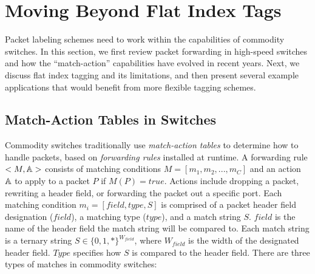 \section{Moving Beyond Flat Index Tags}
\label{sec:background}


Packet labeling schemes need to work within the capabilities of commodity switches.  In this section, we first review packet forwarding in high-speed switches and how the ``match-action'' capabilities have evolved in recent years.  Next, we discuss flat index tagging and its limitations, and then present several example applications that would benefit from more flexible tagging schemes.

\subsection{Match-Action Tables in Switches}
Commodity switches traditionally use \emph{match-action tables} to determine how to handle packets, based on \textit{forwarding rules} installed at runtime. A forwarding rule $<M, \AA>$ consists of matching conditions $M = [m_1, m_2, ..., m_C]$ and an action $\AA$ to apply to a packet $P$ if $M(P) = true$. Actions include dropping a packet, rewriting a header field, or forwarding the packet out a specific port. Each matching condition $m_i = [field, type, S]$ is comprised of a packet header field designation ($field$), a matching type ($type$), and a match string $S$. $field$ is the name of the header field the match string will be compared to. Each match string is a ternary string $S \in \{0,1,*\}^{W_{field}}$, where $W_{field}$ is the width of the designated header field. $Type$ specifies how $S$ is compared to the header field. There are three types of matches in commodity switches:

